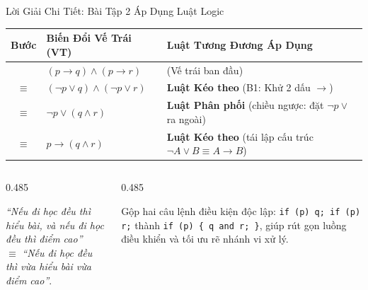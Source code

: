 \documentclass[aspectratio=169, 10pt]{beamer}
\begin{document}
\begin{frame}{Lời Giải Chi Tiết: Bài Tập 2 Áp Dụng Luật Logic}
  \begin{cozyExample}
    \centering
    \renewcommand{\arraystretch}{1.12}
    \small
    \begin{tabular}{cll}
      \toprule
      \textbf{Bước} & \textbf{Biến Đổi Vế Trái (VT)} & \textbf{Luật Tương Đương Áp Dụng} \\
      \midrule
      & $(p \to q) \land (p \to r)$ & \textcolor{cozyMuted}{(Vế trái ban đầu)} \\
      $\equiv$ & $(\neg p \lor q) \land (\neg p \lor r)$ & \textbf{Luật Kéo theo} (B1: Khử 2 dấu $\to$) \\
      $\equiv$ & $\neg p \lor (q \land r)$ & \textbf{Luật Phân phối} (chiều ngược: đặt $\neg p \lor$ ra ngoài) \\
      $\equiv$ & $p \to (q \land r)$ & \textbf{Luật Kéo theo} (tái lập cấu trúc $\neg A \lor B \equiv A \to B$) \\
      \bottomrule
    \end{tabular}
  \end{cozyExample}
  \vspace{0.05cm}
  \begin{columns}[t, onlytextwidth]
    \begin{column}{0.485\textwidth}
      \begin{cozyInsight}
        \small
        \textit{``Nếu đi học đều thì hiểu bài, và nếu đi học đều thì điểm cao''}\\
        $\equiv$ \textit{``Nếu đi học đều thì vừa hiểu bài vừa điểm cao''}.
      \end{cozyInsight}
    \end{column}
    \begin{column}{0.485\textwidth}
      \begin{cozyMethod}
        \small
        Gộp hai câu lệnh điều kiện độc lập:
        \texttt{if (p) q; if (p) r;} thành \texttt{if (p) \{ q and r; \}}, giúp rút gọn luồng điều khiển và tối ưu rẽ nhánh vi xử lý.
      \end{cozyMethod}
    \end{column}
  \end{columns}
\end{frame}
\end{document}
